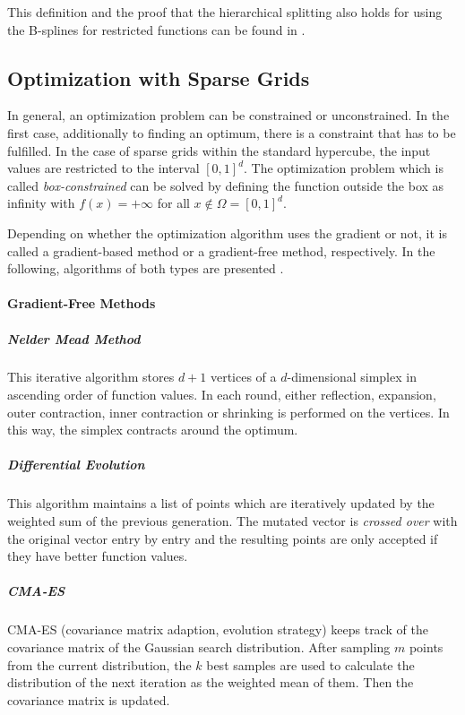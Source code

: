 This definition and the proof that the hierarchical splitting also holds for using the B-splines for restricted functions can be found in \cite{b_splines}.

\subsection{Optimization with Sparse Grids}\label{Optimization_algorithms}

In general, an optimization problem can be constrained or unconstrained. In the first case, additionally to finding an optimum, there is a constraint that has to be fulfilled. In the case of sparse grids within the standard hypercube, the input values are restricted to the interval $ [0,1]^d $. The optimization problem which is called \textit{box-constrained} can be solved by defining the function outside the box as infinity with $ f(x) = +\infty $ for all $ x \notin \Omega = [0,1]^d $. 

Depending on whether the optimization algorithm uses the gradient or not, it is called a gradient-based method or a gradient-free method, respectively. In the following, algorithms of both types are presented \cite{b_splines}.

\paragraph{Gradient-Free Methods}

\subparagraph{Nelder Mead Method}
This iterative algorithm stores $ d+1 $ vertices of a $ d $-dimensional simplex in ascending order of function values. In each round, either reflection, expansion, outer contraction, inner contraction or shrinking is performed on the vertices. In this way, the simplex contracts around the optimum.

\subparagraph{Differential Evolution}
This algorithm maintains a list of points which are iteratively updated by the weighted sum of the previous generation. The mutated vector is \textit{crossed over} with the original vector entry by entry and the resulting points are only accepted if they have better function values. 

\subparagraph{CMA-ES}
CMA-ES (covariance matrix adaption, evolution strategy) keeps track of the covariance matrix of the Gaussian search distribution. After sampling $ m $ points from the current distribution, the $ k $ best samples are used to calculate the distribution of the next iteration as the weighted mean of them. Then the covariance matrix is updated.


